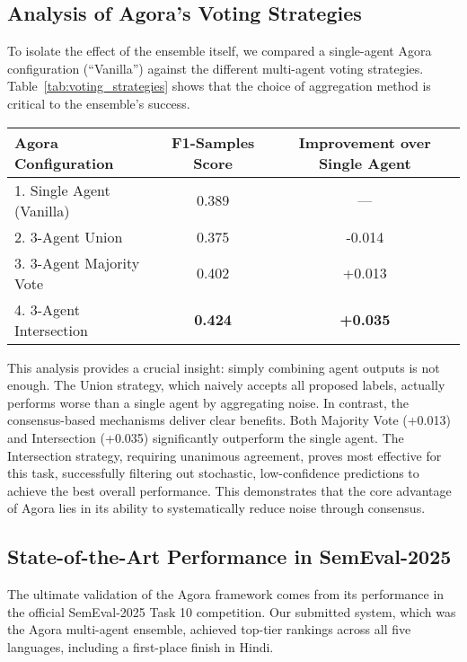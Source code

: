 \subsection{Analysis of Agora's Voting Strategies}

To isolate the effect of the ensemble itself, we compared a single-agent Agora configuration (``Vanilla'') against the different multi-agent voting strategies. Table~\ref{tab:voting_strategies} shows that the choice of aggregation method is critical to the ensemble's success.

\begin{table*}[!ht]
\centering
\caption{Ablation of Agora Configurations on the English Dataset (F1-Samples).}
\label{tab:voting_strategies}
\begin{tabular}{lcc}
\hline
\textbf{Agora Configuration} & \textbf{F1-Samples Score} & \textbf{Improvement over Single Agent} \\
\hline
1. Single Agent (Vanilla) & 0.389 & --- \\
2. 3-Agent Union & 0.375 & -0.014 \\
3. 3-Agent Majority Vote & 0.402 & +0.013 \\
4. 3-Agent Intersection & \textbf{0.424} & \textbf{+0.035} \\
\hline
\end{tabular}
\end{table*}

This analysis provides a crucial insight: simply combining agent outputs is not enough. The Union strategy, which naively accepts all proposed labels, actually performs worse than a single agent by aggregating noise. In contrast, the consensus-based mechanisms deliver clear benefits. Both Majority Vote (+0.013) and Intersection (+0.035) significantly outperform the single agent. The Intersection strategy, requiring unanimous agreement, proves most effective for this task, successfully filtering out stochastic, low-confidence predictions to achieve the best overall performance. This demonstrates that the core advantage of Agora lies in its ability to systematically reduce noise through consensus.

\subsection{State-of-the-Art Performance in SemEval-2025}

The ultimate validation of the Agora framework comes from its performance in the official SemEval-2025 Task 10 competition. Our submitted system, which was the Agora multi-agent ensemble, achieved top-tier rankings across all five languages, including a first-place finish in Hindi.


